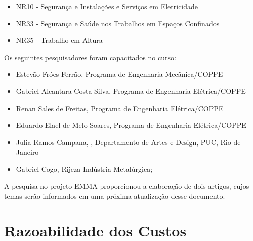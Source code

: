 \begin{itemize}
  \item NR10 - Segurança e Instalações e Serviços em Eletricidade
  \item NR33 - Segurança e Saúde nos Trabalhos em Espaços Confinados
  \item NR35 - Trabalho em Altura
\end{itemize}

Os seguintes pesquisadores foram capacitados no curso:

\begin{itemize}
  \item Estevão Fróes Ferrão, Programa de Engenharia Mecânica/COPPE
  \item Gabriel Alcantara Costa Silva, Programa de Engenharia Elétrica/COPPE
  \item Renan Sales de Freitas, Programa de Engenharia Elétrica/COPPE
  \item Eduardo Elael de Melo Soares, Programa de Engenharia Elétrica/COPPE
  \item Julia Ramos Campana, , Departamento de Artes e Design, PUC, Rio de
  Janeiro
  \item Gabriel Cogo, Rijeza Indústria Metalúrgica;
\end{itemize}

A pesquisa no projeto EMMA proporcionou a elaboração de dois artigos, cujos
temas serão informados em uma próxima atualização desse documento.


% 

\section{Razoabilidade dos Custos}

